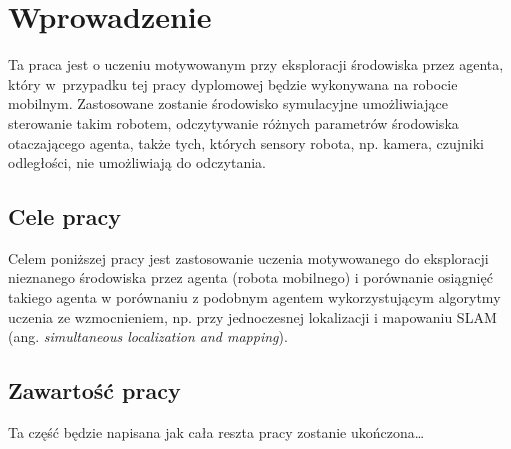 \chapter{Wprowadzenie}
\label{cha:wprowadzenie}

Ta praca jest o uczeniu motywowanym przy eksploracji środowiska przez agenta, który w~przypadku tej pracy dyplomowej będzie wykonywana na robocie mobilnym. 
Zastosowane zostanie środowisko symulacyjne umożliwiające sterowanie takim robotem, odczytywanie różnych parametrów środowiska otaczającego agenta, także tych, których sensory robota, np. kamera, czujniki odległości, nie umożliwiają do odczytania.


\section{Cele pracy}
\label{sec:cele_pracy}

Celem poniższej pracy jest zastosowanie uczenia motywowanego do eksploracji nieznanego środowiska przez agenta (robota 
mobilnego) i porównanie osiągnięć takiego agenta w porównaniu z podobnym agentem wykorzystującym algorytmy uczenia 
ze wzmocnieniem, np. przy jednoczesnej lokalizacji i mapowaniu SLAM (ang. \textit{simultaneous 
localization and mapping}).


\section{Zawartość pracy}
\label{sec:zawartosc_pracy}

Ta część będzie napisana jak cała reszta pracy zostanie ukończona\dots
